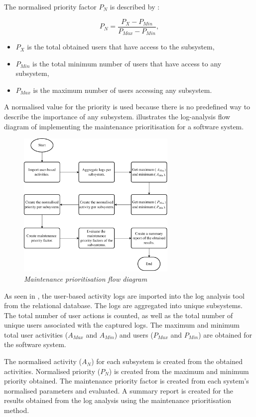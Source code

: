 The normalised priority factor $P_N$ is described by :

\begin{equation}
	\label{eq:ch2_priorityNormalised}
	P_{N} = \frac{P_X - P_{Min}}{P_{Max} - P_{Min}},
\end{equation}

\begin{itemize}
	\item $P_X$ is the total obtained users that have access to the subsystem,
	\item $P_{Min}$ is the total minimum number of users that have access to any subsystem,
	\item $P_{Max}$ is the maximum number of users accessing any subsystem.
\end{itemize}

A normalised value for the priority is used because there is no predefined way to describe the importance of any subsystem.  illustrates the log-analysis flow diagram of implementing the maintenance prioritisation for a software system. 

\begin{figure}[!htb]
	\centering
	\includegraphics[width=0.68\textwidth]{img/Chapter2/maintenancePriortisation/maintenancePriortisation.pdf}
	\caption[Maintenance prioritisation flow diagram]
	{\textit{Maintenance prioritisation flow diagram}}\label{fig:ch2_maintenancePriortisationFlow}
\end{figure}

As seen in , the user-based activity logs are imported into the log analysis tool from the relational database. The logs are aggregated into unique subsystems. The total number of user actions is counted, as well as the total number of unique users associated with the captured logs. The maximum and minimum total user activities ($A_{Max}$ and $A_{Min}$) and users ($P_{Max}$ and $P_{Min}$) are obtained for the software system. \par The normalised activity ($A_N$) for each subsystem is created from the obtained activities. Normalised priority ($P_N$) is created from the maximum and minimum priority obtained. The maintenance priority factor is created from each system's normalised parameters and evaluated. A summary report is created for the results obtained from the log analysis using the maintenance prioritisation method.

